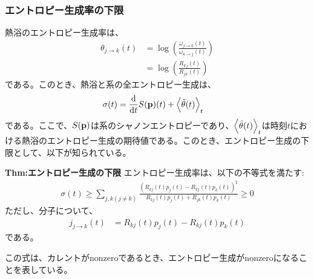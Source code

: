 \documentclass[a4paper,11pt]{jsarticle}
\numberwithin{equation}{section}
\begin{document}
\subsubsection{エントロピー生成率の下限}
熱浴のエントロピー生成率は、
\begin{align}
  \theta_{j \to k}(t) &= \log(\frac{\omega_{j \to k}(t)}{\omega_{k \to j}(t)})\\
  &= \log(\frac{R_{kj}(t)}{R_{jk}(t)})
\end{align}
である。このとき、熱浴と系の全エントロピー生成は、
\begin{align}
  \sigma(t) &= \dv{t}S(\vb{p})(t) + \ev{\hat{\theta}(t)}_t 
\end{align}
である。ここで、$S(\vb{p})$は系のシャノンエントロピーであり、$\ev{\hat{\theta}(t)}_t$は時刻$t$における熱浴のエントロピー生成の期待値である。このとき、エントロピー生成の下限として、以下が知られている。
\begin{itembox}[l]{\textbf{Thm:エントロピー生成の下限}}
    エントロピー生成率は、以下の不等式を満たす:
    \begin{align}
      \sigma(t) \geq \sum_{j,k(j \neq k)}\frac{(R_{kj}(t)p_j(t)-R_{kj}(t)p_k(t))^2}{R_{kj}(t)p_j(t)+R_{jk}(t)p_k(t)} \geq 0
    \end{align}
    ただし、分子について、
    \begin{align}
      j_{j\to k}(t) &= R_{kj}(t)p_j(t)-R_{kj}(t)p_k(t)
    \end{align}
    である。
\end{itembox}
この式は、カレントがnonzeroであるとき、エントロピー生成がnonzeroになることを表している。
\end{document}
